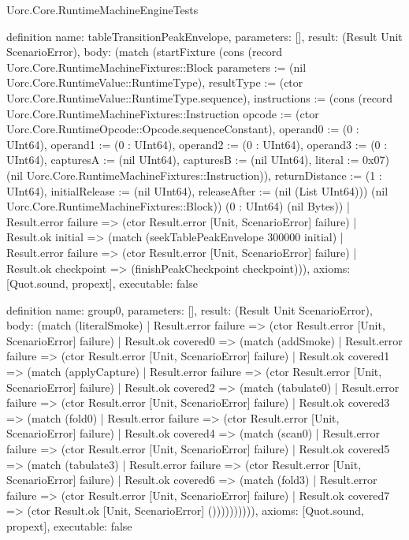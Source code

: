 \begin{lexlean}{Uorc.Core.RuntimeMachineEngineTests}
\begin{semanticmodule}
definition{
  name: tableTransitionPeakEnvelope,
  parameters: [],
  result: (Result Unit ScenarioError),
  body: (match (startFixture (cons (record Uorc.Core.RuntimeMachineFixtures::Block {parameters := (nil Uorc.Core.RuntimeValue::RuntimeType), resultType := (ctor Uorc.Core.RuntimeValue::RuntimeType.sequence), instructions := (cons (record Uorc.Core.RuntimeMachineFixtures::Instruction {opcode := (ctor Uorc.Core.RuntimeOpcode::Opcode.sequenceConstant), operand0 := (0 : UInt64), operand1 := (0 : UInt64), operand2 := (0 : UInt64), operand3 := (0 : UInt64), capturesA := (nil UInt64), capturesB := (nil UInt64), literal := 0x07}) (nil Uorc.Core.RuntimeMachineFixtures::Instruction)), returnDistance := (1 : UInt64), initialRelease := (nil UInt64), releaseAfter := (nil (List UInt64))}) (nil Uorc.Core.RuntimeMachineFixtures::Block)) (0 : UInt64) (nil Bytes))
    | Result.error failure => (ctor Result.error [Unit, ScenarioError] failure)
    | Result.ok initial => (match (seekTablePeakEnvelope 300000 initial)
      | Result.error failure => (ctor Result.error [Unit, ScenarioError] failure)
      | Result.ok checkpoint => (finishPeakCheckpoint checkpoint))),
  axioms: [Quot.sound, propext],
  executable: false
}

definition{
  name: group0,
  parameters: [],
  result: (Result Unit ScenarioError),
  body: (match (literalSmoke)
    | Result.error failure => (ctor Result.error [Unit, ScenarioError] failure)
    | Result.ok covered0 => (match (addSmoke)
      | Result.error failure => (ctor Result.error [Unit, ScenarioError] failure)
      | Result.ok covered1 => (match (applyCapture)
        | Result.error failure => (ctor Result.error [Unit, ScenarioError] failure)
        | Result.ok covered2 => (match (tabulate0)
          | Result.error failure => (ctor Result.error [Unit, ScenarioError] failure)
          | Result.ok covered3 => (match (fold0)
            | Result.error failure => (ctor Result.error [Unit, ScenarioError] failure)
            | Result.ok covered4 => (match (scan0)
              | Result.error failure => (ctor Result.error [Unit, ScenarioError] failure)
              | Result.ok covered5 => (match (tabulate3)
                | Result.error failure => (ctor Result.error [Unit, ScenarioError] failure)
                | Result.ok covered6 => (match (fold3)
                  | Result.error failure => (ctor Result.error [Unit, ScenarioError] failure)
                  | Result.ok covered7 => (ctor Result.ok [Unit, ScenarioError] ()))))))))),
  axioms: [Quot.sound, propext],
  executable: false
}


\end{semanticmodule}
\end{lexlean}
